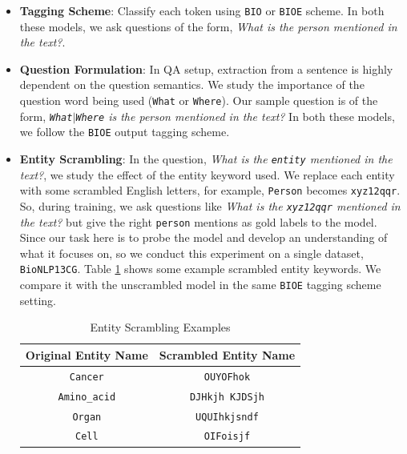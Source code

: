 \begin{itemize}
    \item \textbf{Tagging Scheme}: Classify each token using \texttt{BIO} or \texttt{BIOE} scheme. In both these models, we ask questions of the form, \textit{What is the person mentioned in the text?}.
    
    \item \textbf{Question Formulation}: In QA setup, extraction from a sentence is highly dependent on the question semantics. We study the importance of the question word being used (\texttt{What} or \texttt{Where}). Our sample question is of the form, \textit{\texttt{What}$\vert$\texttt{Where} is the person mentioned in the text?} In both these models, we follow the \texttt{BIOE} output tagging scheme.
    
    \item \textbf{Entity Scrambling}: In the question, \textit{What is the \texttt{entity} mentioned in the text?}, we study the effect of the entity keyword used. We replace each entity with some scrambled English letters, for example, \texttt{Person} becomes \texttt{xyz12qqr}. So, during training, we ask questions like \textit{What is the \texttt{xyz12qqr} mentioned in the text?} but give the right \texttt{person} mentions as gold labels to the model. Since our task here is to probe the model and develop an understanding of what it focuses on, so we conduct this experiment on a single dataset, \texttt{BioNLP13CG}. Table \ref{tab:entity_scramble_bio} shows some example scrambled entity keywords. We compare it with the unscrambled model in the same \texttt{BIOE} tagging scheme setting.
    
    \begin{table}[h!]
    \centering
    \begin{tabular}{|c|c|}\hline
    	\textbf{Original Entity Name} & \textbf{Scrambled Entity Name}\\\hline
    	\texttt{Cancer} & \texttt{OUYOFhok}\\\hline
    	\texttt{Amino\_acid} & \texttt{DJHkjh KJDSjh}\\\hline
    	\texttt{Organ} & \texttt{UQUIhkjsndf}\\\hline
    	\texttt{Cell} & \texttt{OIFoisjf}\\\hline
    	\end{tabular}
        \caption{Entity Scrambling Examples}
        \label{tab:entity_scramble_bio}
    \end{table}
\end{itemize}

